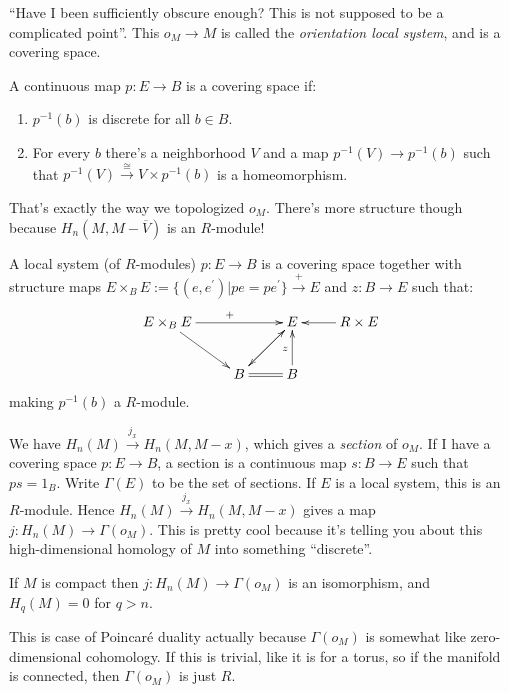 ``Have I been sufficiently obscure enough? This is not supposed to be a complicated point''. This $o_M\to M$ is called the \emph{orientation local system}, and is a covering space.
\begin{definition}
A continuous map $p:E\to B$ is a covering space if:
\begin{enumerate}
\item $p^{-1}(b)$ is discrete for all $b\in B$.
\item For every $b$ there's a neighborhood $V$ and a map $p^{-1}(V)\to p^{-1}(b)$ such that $p^{-1}(V)\xrightarrow{\cong}V\times p^{-1}(b)$ is a homeomorphism.
\end{enumerate}
\end{definition}
That's exactly the way we topologized $o_M$. There's more structure though because $H_n(M,M-\overline{V})$ is an $R$-module!
\begin{definition}
A local system (of $R$-modules) $p:E\to B$ is a covering space together with structure maps $E\times_B E:=\{(e,e^\prime)|pe=pe^\prime\}\xrightarrow{+} E$ and $z:B\to E$ such that:
\begin{equation*}
\xymatrix{
	E\times_B E\ar[rr]^+\ar[dr] & & E\ar[dl] & R\times E\ar[l]\\
	 & B\ar@{=}[r]\ar[ur] & B\ar[u]^{z} & 
}
\end{equation*}
making $p^{-1}(b)$ a $R$-module.
\end{definition}
We have $H_n(M)\xrightarrow{j_x}H_n(M,M-x)$, which gives a \emph{section} of $o_M$. If I have a covering space $p:E\to B$, a section is a continuous map $s:B\to E$ such that $ps=1_B$. Write $\Gamma(E)$ to be the set of sections. If $E$ is a local system, this is an $R$-module. Hence $H_n(M)\xrightarrow{j_x}H_n(M,M-x)$ gives a map $j:H_n(M)\to \Gamma(o_M)$. This is pretty cool because it's telling you about this high-dimensional homology of $M$ into something ``discrete''.
\begin{theorem}
If $M$ is compact then $j:H_n(M)\to\Gamma(o_M)$ is an isomorphism, and $H_q(M)=0$ for $q>n$.
\end{theorem}
This is case of Poincar\'{e} duality actually because $\Gamma(o_M)$ is somewhat like zero-dimensional cohomology. If this is trivial, like it is for a torus, so if the manifold is connected, then $\Gamma(o_M)$ is just $R$.
